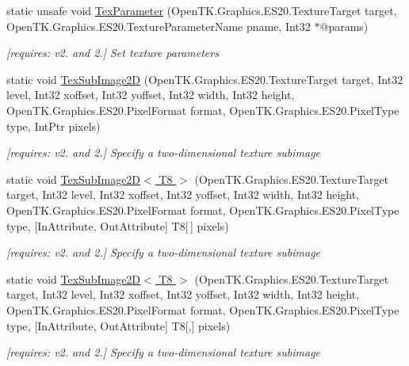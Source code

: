 \begin{DoxyCompactItemize}
static unsafe void \hyperlink{class_open_t_k_1_1_graphics_1_1_e_s20_1_1_g_l_a7b0c8bab05b9ede982a5e989f48f0684}{Tex\-Parameter} (Open\-T\-K.\-Graphics.\-E\-S20.\-Texture\-Target target, Open\-T\-K.\-Graphics.\-E\-S20.\-Texture\-Parameter\-Name pname, Int32 $\ast$@params)
\begin{DoxyCompactList}\small\item\em \mbox{[}requires\-: v2. and 2.\mbox{]} Set texture parameters \end{DoxyCompactList}\item 
static void \hyperlink{class_open_t_k_1_1_graphics_1_1_e_s20_1_1_g_l_acbecea075a3762f6f91da6af19b210f0}{Tex\-Sub\-Image2\-D} (Open\-T\-K.\-Graphics.\-E\-S20.\-Texture\-Target target, Int32 level, Int32 xoffset, Int32 yoffset, Int32 width, Int32 height, Open\-T\-K.\-Graphics.\-E\-S20.\-Pixel\-Format format, Open\-T\-K.\-Graphics.\-E\-S20.\-Pixel\-Type type, Int\-Ptr pixels)
\begin{DoxyCompactList}\small\item\em \mbox{[}requires\-: v2. and 2.\mbox{]} Specify a two-\/dimensional texture subimage \end{DoxyCompactList}\item 
static void \hyperlink{class_open_t_k_1_1_graphics_1_1_e_s20_1_1_g_l_a92e422ed69d2f8b0f9791dfa9b49dc76}{Tex\-Sub\-Image2\-D$<$ T8 $>$} (Open\-T\-K.\-Graphics.\-E\-S20.\-Texture\-Target target, Int32 level, Int32 xoffset, Int32 yoffset, Int32 width, Int32 height, Open\-T\-K.\-Graphics.\-E\-S20.\-Pixel\-Format format, Open\-T\-K.\-Graphics.\-E\-S20.\-Pixel\-Type type, \mbox{[}In\-Attribute, Out\-Attribute\mbox{]} T8\mbox{[}$\,$\mbox{]} pixels)
\begin{DoxyCompactList}\small\item\em \mbox{[}requires\-: v2. and 2.\mbox{]} Specify a two-\/dimensional texture subimage \end{DoxyCompactList}\item 
static void \hyperlink{class_open_t_k_1_1_graphics_1_1_e_s20_1_1_g_l_aa1de88f5fb11dc356913b9ea56f840a2}{Tex\-Sub\-Image2\-D$<$ T8 $>$} (Open\-T\-K.\-Graphics.\-E\-S20.\-Texture\-Target target, Int32 level, Int32 xoffset, Int32 yoffset, Int32 width, Int32 height, Open\-T\-K.\-Graphics.\-E\-S20.\-Pixel\-Format format, Open\-T\-K.\-Graphics.\-E\-S20.\-Pixel\-Type type, \mbox{[}In\-Attribute, Out\-Attribute\mbox{]} T8\mbox{[},\mbox{]} pixels)
\begin{DoxyCompactList}\small\item\em \mbox{[}requires\-: v2. and 2.\mbox{]} Specify a two-\/dimensional texture subimage \end{DoxyCompactList}\item 

\end{DoxyCompactItemize}
